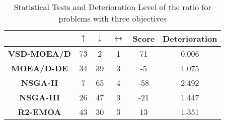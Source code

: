 \begin{table*}[t]
\caption{Statistical Tests and Deterioration Level of the \HV{} ratio for problems with three objectives}
\label{tab:Tests_HV_3obj}
\centering
\begin{tabular}{c|c|c|c|c|c|}
\cline{2-6}
 & \textbf{$\uparrow$} & \textbf{$\downarrow$} & \textbf{$\leftrightarrow$} & \textbf{Score} & \textbf{Deterioration} \\ \hline
\multicolumn{1}{|c|}{\textbf{VSD-MOEA/D}} & 73 & 2 & 1 & 71 & 0.006 \\ \hline
\multicolumn{1}{|c|}{\textbf{MOEA/D-DE}} & 34 & 39 & 3 & -5 & 1.075 \\ \hline
\multicolumn{1}{|c|}{\textbf{NSGA-II}} & 7 & 65 & 4 & -58 & 2.492 \\ \hline
\multicolumn{1}{|c|}{\textbf{NSGA-III}} & 26 & 47 & 3 & -21 & 1.447 \\ \hline
\multicolumn{1}{|c|}{\textbf{R2-EMOA}} & 43 & 30 & 3 & 13 & 1.351 \\ \hline
\end{tabular}
\end{table*}




